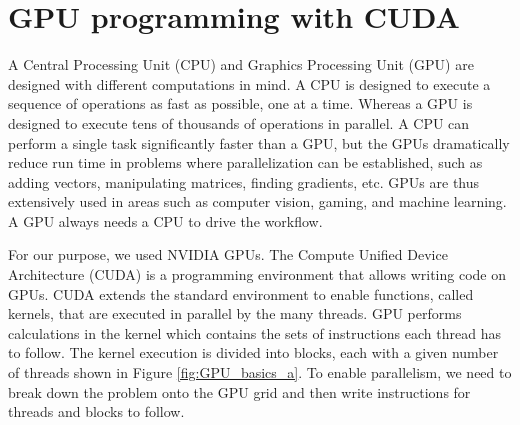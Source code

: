 \section{GPU programming with CUDA {\cpp} }%

A Central Processing Unit (CPU) and Graphics Processing Unit (GPU) are designed with different computations in mind. A CPU is designed to execute a sequence of operations as fast as possible, one at a time. Whereas a GPU is designed to execute tens of thousands of operations in parallel. A CPU can perform a single task significantly faster than a GPU, but the GPUs dramatically reduce run time in problems where parallelization can be established, such as adding vectors, manipulating matrices, finding gradients, etc. GPUs are thus extensively used in areas such as computer vision, gaming, and machine learning. A GPU always needs a CPU to drive the workflow. 

For our purpose, we used NVIDIA GPUs. The Compute Unified Device Architecture (CUDA) is a programming environment that allows writing {\cpp} code on GPUs. CUDA extends the standard {\cpp} environment to enable functions, called kernels, that are executed in parallel by the many threads. GPU performs calculations in the kernel which contains the sets of instructions each thread has to follow. The kernel execution is divided into blocks, each with a given number of threads shown in Figure \ref{fig:GPU_basics_a}. To enable parallelism, we need to break down the problem onto the GPU grid and then write instructions for threads and blocks to follow.

